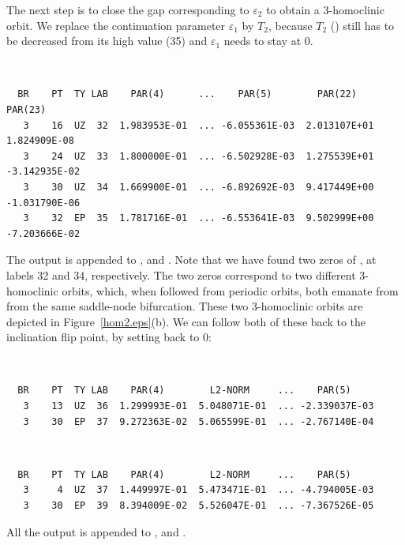 The next step is to close the gap corresponding to $\varepsilon_2$ to
obtain a 3-homoclinic orbit. We replace the continuation parameter
$\varepsilon_1$ by $T_2$, because $T_2$ ()
still has to be decreased from
its high value (35) and $\varepsilon_1$ needs to stay at 0.
\begin{center}
 \\
\end{center} 
\begin{verbatim}
  BR    PT  TY LAB    PAR(4)      ...    PAR(5)        PAR(22)       PAR(23)    
   3    16  UZ  32  1.983953E-01  ... -6.055361E-03  2.013107E+01  1.824909E-08
   3    24  UZ  33  1.800000E-01  ... -6.502928E-03  1.275539E+01 -3.142935E-02
   3    30  UZ  34  1.669900E-01  ... -6.892692E-03  9.417449E+00 -1.031790E-06
   3    32  EP  35  1.781716E-01  ... -6.553641E-03  9.502999E+00 -7.203666E-02
\end{verbatim}
The output is appended to ,   and .
Note that we have found two zeros of , at labels 32 and
34, respectively. The two zeros
correspond to two different 3-homoclinic
orbits, which, when followed from periodic orbits, both emanate from
from the same saddle-node bifurcation.
These two 3-homoclinic orbits are depicted in Figure~\ref{hom2.eps}(b).
We can follow both of these back to the inclination flip point, by
setting  back to 0:
\begin{center}
 \\
\end{center} 
\begin{verbatim}
  BR    PT  TY LAB    PAR(4)        L2-NORM     ...    PAR(5)     
   3    13  UZ  36  1.299993E-01  5.048071E-01  ... -2.339037E-03
   3    30  EP  37  9.272363E-02  5.065599E-01  ... -2.767140E-04
\end{verbatim}
\begin{center}
 \\
\end{center}
\begin{verbatim}
  BR    PT  TY LAB    PAR(4)        L2-NORM     ...    PAR(5)     
   3     4  UZ  37  1.449997E-01  5.473471E-01  ... -4.794005E-03
   3    30  EP  39  8.394009E-02  5.526047E-01  ... -7.367526E-05
\end{verbatim}
All the output is appended to ,   and .
